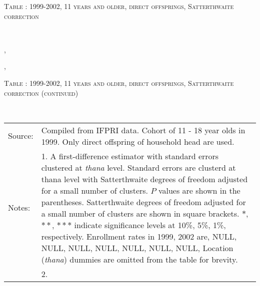 \begin{table}\hfil\textsc{\footnotesize Table \thetable: 1999-2002, 11 years and older, direct offsprings, Satterthwaite correction\label{zEm.1999.10.sameN}}\\\setlength{\tabcolsep}{1pt}\renewcommand{\arraystretch}{.675}\hspace{-2em}\hfil{}\\\renewcommand{\arraystretch}{1}\end{table}, \addtocounter{table}{-1}, \begin{table}\hfil\textsc{\footnotesize Table \thetable: 1999-2002, 11 years and older, direct offsprings, Satterthwaite correction (continued)\label{zEm.1999.10.sameN}}\\\setlength{\tabcolsep}{1pt}\renewcommand{\arraystretch}{.675}\hspace{-2em}\hfil{}\\\renewcommand{\arraystretch}{1}\hfil\begin{tabular}{>{\hfill\scriptsize}p{1cm}<{}>{\scriptsize}p{12cm}<{\hfill}} Source:& Compiled from IFPRI data. Cohort of 11 - 18 year olds in 1999. Only direct offspring of household head are used.\\[-1ex] Notes:& 1. A first-difference estimator with standard errors clustered at \textit{thana} level. Standard errors are clusterd at thana level with Satterthwaite degrees of freedom adjusted for a small number of clusters. $P$ values are shown in the parentheses. Satterthwaite degrees of freedom adjusted for a small number of clusters are shown in square brackets. $*$, $**$, $***$ indicate significance levels at 10\%, 5\%, 1\%, respectively. Enrollment rates in 1999, 2002 are, NULL, NULL, NULL, NULL, NULL, NULL, NULL, Location (\textit{thana}) dummies are omitted from the table for brevity. \\ & 2.   \end{tabular} \end{table}
